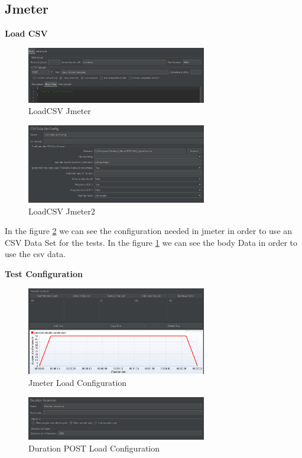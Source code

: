 \documentclass[a4paper,11pt,openright,BCOR=15mm]{scrbook}
\begin{document}
		\subsection{Jmeter}

		\textbf{Load CSV}
		\begin{figure}[H]
			\centering
			\includegraphics[width=0.7\textwidth]{figs/Performance/Test Configuration/LoadCSV-Jmeter.png}
			\caption{LoadCSV Jmeter}
			\label{fig:LoadCSV Jmeter}
		 \end{figure}
		\begin{figure}[H]
			\centering
			\includegraphics[width=0.7\textwidth]{figs/Performance/Test Configuration/LoadCSV-Jmeter2.png}
			\caption{LoadCSV Jmeter2}
			\label{fig:LoadCSV Jmeter2}
		 \end{figure}

		 In the figure \ref{fig:LoadCSV Jmeter2} we can see the configuration needed in jmeter in order to use an CSV Data Set for the tests. In the figure \ref{fig:LoadCSV Jmeter} we can see the body Data in order to use the csv data.


		\textbf{Test Configuration}
		\begin{figure}[H]
			\centering
			\includegraphics[width=0.7\textwidth]{figs/Performance/Test Configuration/JMETER-LOAD.png}
			\caption{Jmeter Load Configuration}
			\label{fig:JMETER-LOADPOST}
		\end{figure}
		\begin{figure}[H]
			\centering
			\includegraphics[width=0.7\textwidth]{figs/Performance/Test Configuration/Duration-SOAK-LOAD-JMETER.png}
			\caption{Duration POST Load Configuration}
			\label{fig:DurationPostLoad}
		\end{figure}
\end{document}
